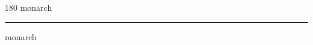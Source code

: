 
\begin{frame}
\begin{center}
\begin{turn}{180}
{\fontsize{2.5cm}{1em}\selectfont monarch}
\end{turn}
\vspace{1em}\par  
\hrule
\vspace{1em}\par  
{\fontsize{2.5cm}{1em}\selectfont monarch}
\end{center}
\end{frame}
